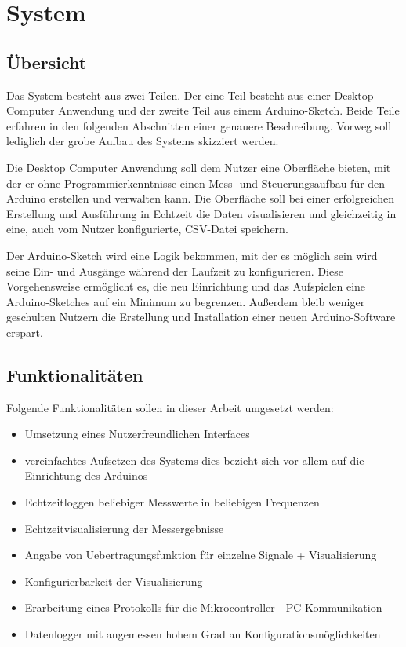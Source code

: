 \chapter{System}
\section{Übersicht}
Das System besteht aus zwei Teilen. Der eine Teil besteht aus einer Desktop Computer Anwendung und der zweite Teil  aus einem Arduino-Sketch.
Beide Teile erfahren in den folgenden Abschnitten einer genauere Beschreibung. Vorweg soll lediglich der grobe Aufbau des Systems skizziert werden.

Die Desktop Computer Anwendung soll dem Nutzer eine Oberfläche bieten, mit der er ohne Programmierkenntnisse einen Mess- und Steuerungsaufbau für den Arduino erstellen und verwalten kann. Die Oberfläche soll bei einer erfolgreichen Erstellung und Ausführung  in Echtzeit die Daten visualisieren und gleichzeitig in eine, auch vom Nutzer konfigurierte, \acrshort{CSV}-Datei speichern.

Der Arduino-Sketch wird eine Logik bekommen, mit der es möglich sein wird seine Ein- und Ausgänge während der Laufzeit zu konfigurieren. Diese Vorgehensweise ermöglicht es, die neu Einrichtung und das Aufspielen eine Arduino-Sketches auf ein Minimum zu begrenzen. Außerdem bleib weniger geschulten Nutzern die Erstellung und Installation einer neuen Arduino-Software erspart.


\section{Funktionalitäten}
Folgende Funktionalitäten sollen in dieser Arbeit umgesetzt werden:
\begin{itemize}
 \item Umsetzung eines Nutzerfreundlichen Interfaces
 \item vereinfachtes Aufsetzen des Systems
 \subitem dies bezieht sich vor allem auf die Einrichtung des Arduinos
 \item Echtzeitloggen beliebiger Messwerte in beliebigen Frequenzen
 \item Echtzeitvisualisierung der Messergebnisse
 \item Angabe von \gls{Uebertragungsfunktion} für einzelne Signale + Visualisierung
 \item Konfigurierbarkeit der Visualisierung
 \item Erarbeitung eines Protokolls für die Mikrocontroller - PC Kommunikation
 \item Datenlogger mit angemessen hohem Grad an Konfigurationsmöglichkeiten
\end{itemize}

